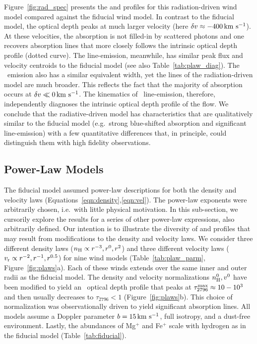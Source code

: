 \documentclass[12pt,preprint]{aastex}
\begin{document}
Figure~\ref{fig:rad_spec} presents the  and 
profiles for this radiation-driven wind model compared against the
fiducial wind model.
In contrast to the fiducial model, 
the optical depth peaks at much larger velocity (here $\delta v
\approx -400 \, {\rm km~s^{-1}}$).  At these velocities, the absorption is not
filled-in by scattered photons and one recovers absorption lines
that more closely follows the intrinsic optical depth profile (dotted
curve). The  line-emission, meanwhile, has
similar peak flux and velocity centroids to the fiducial model (see also
Table~\ref{tab:plaw_diag}).  The \feiis\ emission also has a similar
equivalent width, yet the lines of the radiation-driven model are much
broader. This reflects the fact that the majority of absorption
occurs at $\delta v \ll 0 \, {\rm km~s^{-1}}$.
The kinematics of \feiis\ line-emission, therefore, independently
diagnoses the intrinsic optical depth profile of the flow.
We conclude that the radiative-driven model has characteristics that
are qualitatively similar to the fiducial model (e.g.\ strong
blue-shifted absorption and significant line-emission) with a few
quantitative differences that, in principle, could distinguish them
with high fidelity observations.


\subsection{Power-Law Models}
\label{sec:power}

The fiducial model assumed power-law descriptions for both the density and velocity
laws (Equations~\ref{eqn:density},\ref{eqn:vel}).
The power-law exponents were arbitrarily chosen, i.e.\ with little physical
motivation.  In this sub-section, we cursorily explore the results for a series
of other power-law expressions, also arbitrarily defined.
Our intention is to illustrate the diversity of  and
 profiles that may result from modifications to the density
and velocity laws.
We consider three different density laws ($n_{\rm H} \propto
r^{-3}, r^{0}, r^2$) and three different velocity laws ($v_{\rm r}
\propto r^{-2}, r^{-1}, r^{0.5}$) for nine wind models
(Table~\ref{tab:plaw_parm}, Figure~\ref{fig:plaws}a).  
Each of these winds extends over the same inner and outer radii as the
fiducial model.
The density and velocity normalizations $n_{\rm H}^0, v^0$ have been
modified to yield an \mgiia\ optical depth profile that peaks at
$\tau_{2796}^{\rm max} \approx 10-10^3$ and then usually decreases to
$\tau_{2796} < 1$ (Figure~\ref{fig:plaws}b). 
This choice of normalization was observationally driven to yield
significant absorption lines.
All models assume a Doppler parameter
$b=15\, {\rm km~s^{-1}}$, full isotropy, and a dust-free environment.
Lastly, the abundances of Mg$^+$ and Fe$^+$ scale with hydrogen as
in the fiducial model (Table~\ref{tab:fiducial}).
\end{document}
